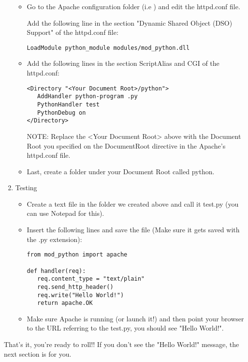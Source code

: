 \begin{enumerate}
\begin{itemize}
\item
Go to the Apache configuration folder (i.e ) and edit the httpd.conf file. 
            
Add the following line in the section "Dynamic Shared Object (DSO)
Support" of the httpd.conf file:

\begin{verbatim}
LoadModule python_module modules/mod_python.dll
\end{verbatim}                    

\item
Add the following lines in the section ScriptAlias and CGI of the httpd.conf: 

\begin{verbatim}                         
<Directory "<Your Document Root>/python">
   AddHandler python-program .py
   PythonHandler test
   PythonDebug on
</Directory>
\end{verbatim}                
    
                    
NOTE: Replace the <Your Document Root> above with the Document Root
you specified on the DocumentRoot directive in the Apache's httpd.conf
file.
                    
\item
Last, create a folder under your Document Root called python. 

\end{itemize}

\item
Testing

\begin{itemize}

\item            
Create a text file in the folder we created above and call it test.py
(you can use Notepad for this).
     
\item       
Insert the following lines and save the file (Make sure it gets saved
with the .py extension):

\begin{verbatim}                    
from mod_python import apache

def handler(req):
   req.content_type = "text/plain" 
   req.send_http_header()
   req.write("Hello World!")
   return apache.OK
\end{verbatim}                   

\item            
Make sure Apache is running (or launch it!) and then point your
browser to the URL referring to the test.py, you should see "Hello
World!".
     
\end{itemize}
\end{enumerate}
       
That's it, you're ready to roll!! If you don't see the "Hello World!"
message, the next section is for you.

